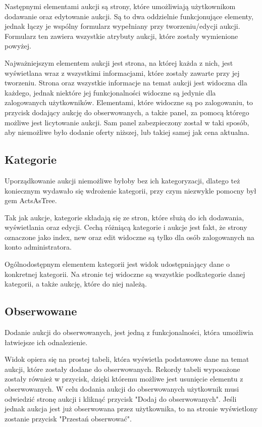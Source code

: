 \documentclass[brudnopis]{xmgr}
\begin{document}
Następnymi elementami aukcji są strony, które umożliwiają użytkownikom dodawanie oraz edytowanie aukcji. Są to dwa oddzielnie funkcjonujące elementy, jednak łączy je wspólny formularz wypełniany przy tworzeniu/edycji aukcji. Formularz ten zawiera wszystkie atrybuty aukcji, które zostały wymienione powyżej.

Najważniejszym elementem aukcji jest strona, na której każda z nich, jest wyświetlana wraz z wszystkimi informacjami, które zostały zawarte przy jej tworzeniu. Strona oraz wszystkie informacje na temat aukcji jest widoczna dla każdego, jednak niektóre jej funkcjonalności widoczne są jedynie dla zalogowanych użytkowników. Elementami, które widoczne są po zalogowaniu, to przycisk dodający aukcję do obserwowanych, a także panel, za pomocą którego możliwe jest licytowanie aukcji. Sam panel zabezpieczony został w taki sposób, aby niemożliwe było dodanie oferty niższej, lub takiej samej jak cena aktualna.

\subsection{Kategorie}

Uporządkowanie aukcji niemożliwe byłoby bez ich kategoryzacji, dlatego też koniecznym wydawało się wdrożenie kategorii, przy czym niezwykle pomocny był gem ActsAsTree. 

Tak jak aukcje, kategorie składają się ze stron, które służą do ich dodawania, wyświetlania oraz edycji. Cechą różniącą kategorie i aukcje jest fakt, że strony oznaczone jako index, new oraz edit widoczne są tylko dla osób zalogowanych na konto administratora.

Ogólnodostępnym elementem kategorii jest widok udostępniający dane o konkretnej kategorii. Na stronie tej widoczne są wszystkie podkategorie danej kategorii, a także aukcję, które do niej należą. 

\subsection{Obserwowane}

Dodanie aukcji do obserwowanych, jest jedną z funkcjonalności, która umożliwia łatwiejsze ich odnalezienie. 

Widok opiera się na prostej tabeli, która wyświetla podstawowe dane na temat aukcji, które zostały dodane do obserwowanych. Rekordy tabeli wyposażone zostały również w przycisk, dzięki któremu możliwe jest usunięcie elementu z obserwowanych. W celu dodania aukcji do obserwowanych użytkownik musi odwiedzić stronę aukcji i kliknąć przycisk "Dodaj do obserwowanych". Jeśli jednak aukcja jest już obserwowana przez użytkownika, to na stronie wyświetlony zostanie przycisk "Przestań obserwować".
\end{document}
